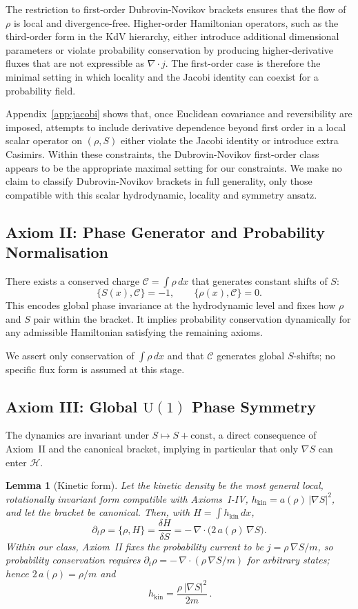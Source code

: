 \documentclass[11pt,a4paper]{article}
\numberwithin{equation}{section}
\theoremstyle{thmcompact}
\newtheorem{lemma}[theorem]{Lemma}
\theoremstyle{remark}
\begin{document}
	The restriction to first-order Dubrovin-Novikov brackets ensures that the flow of $\rho$ is local and divergence-free. Higher-order Hamiltonian operators, such as the third-order form in the KdV hierarchy, either introduce additional dimensional parameters or violate probability conservation by producing higher-derivative fluxes that are not expressible as $\nabla\!\cdot j$. The first-order case is therefore the minimal setting in which locality and the Jacobi identity can coexist for a probability field.
	
	Appendix~\ref{app:jacobi} shows that, once Euclidean covariance and reversibility are imposed, attempts to include derivative dependence beyond first order in a local scalar operator on
	$(\rho,S)$ either violate the Jacobi identity or introduce extra Casimirs. Within these constraints,
	the Dubrovin-Novikov first-order class appears to be the appropriate maximal setting for our constraints. We make no claim to classify Dubrovin-Novikov brackets in full generality, only those compatible with this scalar hydrodynamic, locality and symmetry ansatz.
	
	\subsection*{Axiom II: Phase Generator and Probability Normalisation}
	There exists a conserved charge $\mathcal C=\!\int\rho\,dx$ that generates constant shifts of $S$:
	\[
	\{S(x),\mathcal C\}=-1,\qquad \{\rho(x),\mathcal C\}=0.
	\]
	This encodes global phase invariance at the hydrodynamic level and fixes how $\rho$ and $S$ pair within the bracket. It implies probability conservation dynamically for any admissible Hamiltonian satisfying the remaining axioms.
	
	We assert only conservation of $\int\rho\,dx$ and that $\mathcal C$ generates global $S$-shifts; no specific flux form is assumed at this stage.
	
\subsection*{Axiom III: Global $\mathrm{U}(1)$
 Phase Symmetry}
The dynamics are invariant under $S\mapsto S+\text{const}$, a direct consequence of Axiom~II and the canonical bracket, implying in particular that only $\nabla S$ can enter $\mathcal H$.
	
\begin{lemma}[Kinetic form]\label{lem:kinetic}
	Let the kinetic density be the most general local, rotationally invariant form compatible with Axioms~I-IV,
	$h_{\mathrm{kin}}=a(\rho)\,|\nabla S|^{2}$, and let the bracket be canonical. Then, with $H=\int h_{\mathrm{kin}}\,dx$,
	\[
	\partial_t\rho=\{\rho,H\}=\frac{\delta H}{\delta S}
	=-\,\nabla\!\cdot\!\Big(2\,a(\rho)\,\nabla S\Big).
	\]
	Within our class, Axiom~II fixes the probability current to be $j=\rho\,\nabla S/m$, so probability conservation requires
	$\partial_t\rho=-\,\nabla\!\cdot(\rho\,\nabla S/m)$ for arbitrary states; hence $2\,a(\rho)=\rho/m$ and
	\[
	\boxed{\,h_{\mathrm{kin}}=\frac{\rho\,|\nabla S|^{2}}{2m}\, .}
	\]
\end{lemma}
\end{document}

